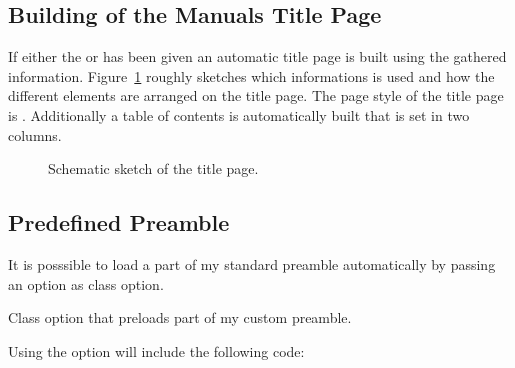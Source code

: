 \documentclass[load-preamble]{cnltx-doc}
\begin{document}
\subsection{Building of the Manuals Title Page}

If either the  or  has been given an automatic
title page is built using the gathered information. Figure~\ref{fig:titlepage}
roughly sketches which informations is used and how the different elements are
arranged on the title page.  The page style of the title page is
.  Additionally a  table of contents is automatically built that
is set in two columns.

\begin{figure}[htb]
  \centering
  \caption{Schematic sketch of the title page.}
  \label{fig:titlepage}
\end{figure}

\subsection{Predefined Preamble}\label{sec:preamble}

It is posssible to load a part of my standard preamble automatically by
passing an option as class option.
\begin{options}
    Class option that preloads part of my custom preamble.
\end{options}

Using the option will include the following code:

\begin{sourcecode}
  \RequirePackage[oldstyle]{libertine}
  \RequirePackage{libertinehologopatch}%
  \RequirePackage[supstfm=libertinesups]{superiors}
  \RequirePackage{microtype}
  \RequirePackage[scaled=.83]{beramono}
  \RequirePackage{fnpct}
  \RequirePackage[english]{babel}
  \renewcommand*\othersectionlevelsformat[3]{%
    \textcolor{cnltx}{#3\autodot}\enskip}
  \renewcommand*\partformat{%
    \textcolor{cnltx}{\partname~\thepart\autodot}}
  \pagestyle{headings}
  \setcapindent{1.5em}
\end{sourcecode}
\end{document}
